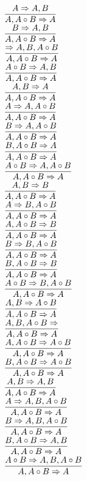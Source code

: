\documentclass[11pt]{article}
\begin{document}
\begin{center}
\bigskip
\\$\infer{A, A\circ B\Rightarrow A}{A\Rightarrow A, B}$
\bigskip
\\$\infer{A, A\circ B\Rightarrow A}{B\Rightarrow A, B}$
\bigskip
\\$\infer{A, A\circ B\Rightarrow A}{\Rightarrow A, B, A\circ B}$
\bigskip
\\$\infer{A, A\circ B\Rightarrow A}{A\circ B\Rightarrow A, B}$
\bigskip
\\$\infer{A, A\circ B\Rightarrow A}{A, B\Rightarrow A}$
\bigskip
\\$\infer{A, A\circ B\Rightarrow A}{A\Rightarrow A, A\circ B}$
\bigskip
\\$\infer{A, A\circ B\Rightarrow A}{B\Rightarrow A, A\circ B}$
\bigskip
\\$\infer{A, A\circ B\Rightarrow A}{B, A\circ B\Rightarrow A}$
\bigskip
\\$\infer{A, A\circ B\Rightarrow A}{A\circ B\Rightarrow A, A\circ B}$
\bigskip
\\$\infer{A, A\circ B\Rightarrow A}{A, B\Rightarrow B}$
\bigskip
\\$\infer{A, A\circ B\Rightarrow A}{A\Rightarrow B, A\circ B}$
\bigskip
\\$\infer{A, A\circ B\Rightarrow A}{A, A\circ B\Rightarrow B}$
\bigskip
\\$\infer{A, A\circ B\Rightarrow A}{B\Rightarrow B, A\circ B}$
\bigskip
\\$\infer{A, A\circ B\Rightarrow A}{B, A\circ B\Rightarrow B}$
\bigskip
\\$\infer{A, A\circ B\Rightarrow A}{A\circ B\Rightarrow B, A\circ B}$
\bigskip
\\$\infer{A, A\circ B\Rightarrow A}{A, B\Rightarrow A\circ B}$
\bigskip
\\$\infer{A, A\circ B\Rightarrow A}{A, B, A\circ B\Rightarrow }$
\bigskip
\\$\infer{A, A\circ B\Rightarrow A}{A, A\circ B\Rightarrow A\circ B}$
\bigskip
\\$\infer{A, A\circ B\Rightarrow A}{B, A\circ B\Rightarrow A\circ B}$
\bigskip
\\$\infer{A, A\circ B\Rightarrow A}{A, B\Rightarrow A, B}$
\bigskip
\\$\infer{A, A\circ B\Rightarrow A}{A\Rightarrow A, B, A\circ B}$
\bigskip
\\$\infer{A, A\circ B\Rightarrow A}{B\Rightarrow A, B, A\circ B}$
\bigskip
\\$\infer{A, A\circ B\Rightarrow A}{B, A\circ B\Rightarrow A, B}$
\bigskip
\\$\infer{A, A\circ B\Rightarrow A}{A\circ B\Rightarrow A, B, A\circ B}$

\end{center}
\end{document}
